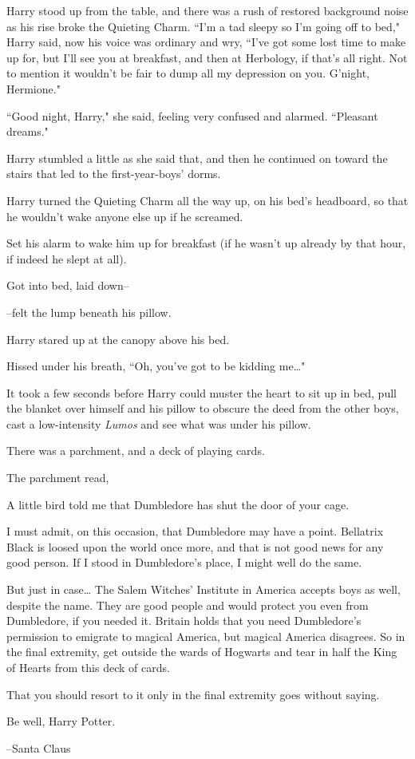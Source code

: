 Harry stood up from the table, and there was a rush of restored background noise as his rise broke the Quieting Charm. ``I'm a tad sleepy so I'm going off to bed," Harry said, now his voice was ordinary and wry, ``I've got some lost time to make up for, but I'll see you at breakfast, and then at Herbology, if that's all right. Not to mention it wouldn't be fair to dump all my depression on you. G'night, Hermione."

``Good night, Harry," she said, feeling very confused and alarmed. ``Pleasant dreams."

Harry stumbled a little as she said that, and then he continued on toward the stairs that led to the first-year-boys' dorms.

\later

Harry turned the Quieting Charm all the way up, on his bed's headboard, so that he wouldn't wake anyone else up if he screamed.

Set his alarm to wake him up for breakfast (if he wasn't up already by that hour, if indeed he slept at all).

Got into bed, laid down\---

\---felt the lump beneath his pillow.

Harry stared up at the canopy above his bed.

Hissed under his breath, ``Oh, you've got to be kidding me{\ldots}"

It took a few seconds before Harry could muster the heart to sit up in bed, pull the blanket over himself and his pillow to obscure the deed from the other boys, cast a low-intensity \emph{Lumos} and see what was under his pillow.

There was a parchment, and a deck of playing cards.

The parchment read,

\begin{writtenNote}
A little bird told me that Dumbledore has shut the door of your cage.

I must admit, on this occasion, that Dumbledore may have a point. Bellatrix Black is loosed upon the world once more, and that is not good news for any good person. If I stood in Dumbledore's place, I might well do the same.

But just in case{\ldots} The Salem Witches' Institute in America accepts boys as well, despite the name. They are good people and would protect you even from Dumbledore, if you needed it. Britain holds that you need Dumbledore's permission to emigrate to magical America, but magical America disagrees. So in the final extremity, get outside the wards of Hogwarts and tear in half the King of Hearts from this deck of cards.

That you should resort to it only in the final extremity goes without saying.

Be well, Harry Potter.

\---Santa Claus
\end{writtenNote}

